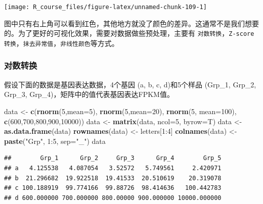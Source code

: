 \documentclass[]{article}
\newenvironment{Shaded}{\begin{snugshade}}{\end{snugshade}}
\newcommand{\KeywordTok}[1]{\textcolor[rgb]{0.13,0.29,0.53}{\textbf{{#1}}}}
\newcommand{\DataTypeTok}[1]{\textcolor[rgb]{0.13,0.29,0.53}{{#1}}}
\newcommand{\DecValTok}[1]{\textcolor[rgb]{0.00,0.00,0.81}{{#1}}}
\newcommand{\StringTok}[1]{\textcolor[rgb]{0.31,0.60,0.02}{{#1}}}
\newcommand{\NormalTok}[1]{{#1}}
\numberwithin{figure}{section}
\numberwithin{table}{section}
\theoremstyle{definition}
\theoremstyle{definition}
\theoremstyle{definition}
\theoremstyle{remark}
\begin{document}
\begin{center}\texttt{[image: R\_course\_files/figure-latex/unnamed-chunk-109-1]} \end{center}

图中只有右上角可以看到红色，其他地方就没了颜色的差异。这通常不是我们想要的。为了更好的可视化效果，需要对数据做些预处理，主要有
\texttt{对数转换}，\texttt{Z-score转换}，\texttt{抹去异常值}，\texttt{非线性颜色}等方式。

\subsubsection{对数转换}

假设下面的数据是基因表达数据，4个基因 (a, b, c, d)和5个样品 (Grp\_1,
Grp\_2, Grp\_3, Grp\_4)，矩阵中的值代表基因表达FPKM值。

\begin{Shaded}
\begin{Highlighting}[]
\NormalTok{data <-}\StringTok{ }\KeywordTok{c}\NormalTok{(}\KeywordTok{rnorm}\NormalTok{(}\DecValTok{5}\NormalTok{,}\DataTypeTok{mean=}\DecValTok{5}\NormalTok{), }\KeywordTok{rnorm}\NormalTok{(}\DecValTok{5}\NormalTok{,}\DataTypeTok{mean=}\DecValTok{20}\NormalTok{), }\KeywordTok{rnorm}\NormalTok{(}\DecValTok{5}\NormalTok{, }\DataTypeTok{mean=}\DecValTok{100}\NormalTok{), }\KeywordTok{c}\NormalTok{(}\DecValTok{600}\NormalTok{,}\DecValTok{700}\NormalTok{,}\DecValTok{800}\NormalTok{,}\DecValTok{900}\NormalTok{,}\DecValTok{10000}\NormalTok{))}
\NormalTok{data <-}\StringTok{ }\KeywordTok{matrix}\NormalTok{(data, }\DataTypeTok{ncol=}\DecValTok{5}\NormalTok{, }\DataTypeTok{byrow=}\NormalTok{T)}
\NormalTok{data <-}\StringTok{ }\KeywordTok{as.data.frame}\NormalTok{(data)}
\KeywordTok{rownames}\NormalTok{(data) <-}\StringTok{ }\NormalTok{letters[}\DecValTok{1}\NormalTok{:}\DecValTok{4}\NormalTok{]}
\KeywordTok{colnames}\NormalTok{(data) <-}\StringTok{ }\KeywordTok{paste}\NormalTok{(}\StringTok{"Grp"}\NormalTok{, }\DecValTok{1}\NormalTok{:}\DecValTok{5}\NormalTok{, }\DataTypeTok{sep=}\StringTok{"_"}\NormalTok{)}
\NormalTok{data}
\end{Highlighting}
\end{Shaded}

\begin{verbatim}
##        Grp_1      Grp_2     Grp_3      Grp_4        Grp_5
## a   4.125538   4.087054   3.52572   5.749561     2.420971
## b  21.296682  19.922518  19.41533  20.510619    20.319078
## c 100.188919  99.774166  99.88726  98.414636   100.442783
## d 600.000000 700.000000 800.00000 900.000000 10000.000000
\end{verbatim}
\end{document}
